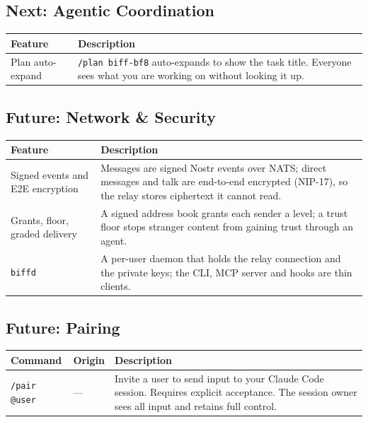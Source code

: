 \documentclass[11pt,letterpaper]{article}
\begin{document}
\subsection*{Next: Agentic Coordination}

\renewcommand{\arraystretch}{1.4}
\begin{tabularx}{\textwidth}{@{}l X@{}}
  \toprule
  \textbf{Feature} & \textbf{Description} \\
  \midrule

  Plan auto-expand &
  \texttt{/plan biff-bf8} auto-expands to show the task title. Everyone
  sees what you are working on without looking it up. \\

  \bottomrule
\end{tabularx}

\subsection*{Future: Network \& Security}

\renewcommand{\arraystretch}{1.4}
\begin{tabularx}{\textwidth}{@{}l X@{}}
  \toprule
  \textbf{Feature} & \textbf{Description} \\
  \midrule

  Signed events and E2E encryption &
  Messages are signed Nostr events over NATS; direct messages and talk are
  end-to-end encrypted (NIP-17), so the relay stores ciphertext it cannot
  read. \\

  Grants, floor, graded delivery &
  A signed address book grants each sender a level; a trust floor stops
  stranger content from gaining trust through an agent. \\

  \texttt{biffd} &
  A per-user daemon that holds the relay connection and the private keys;
  the CLI, MCP server and hooks are thin clients. \\

  \bottomrule
\end{tabularx}

\subsection*{Future: Pairing}

\renewcommand{\arraystretch}{1.4}
\begin{tabularx}{\textwidth}{@{}l l X@{}}
  \toprule
  \textbf{Command} & \textbf{Origin} & \textbf{Description} \\
  \midrule

  \texttt{/pair @user} & --- &
  Invite a user to send input to your Claude Code session. Requires
  explicit acceptance. The session owner sees all input and retains full
  control. \\

  \bottomrule
\end{tabularx}
\end{document}
